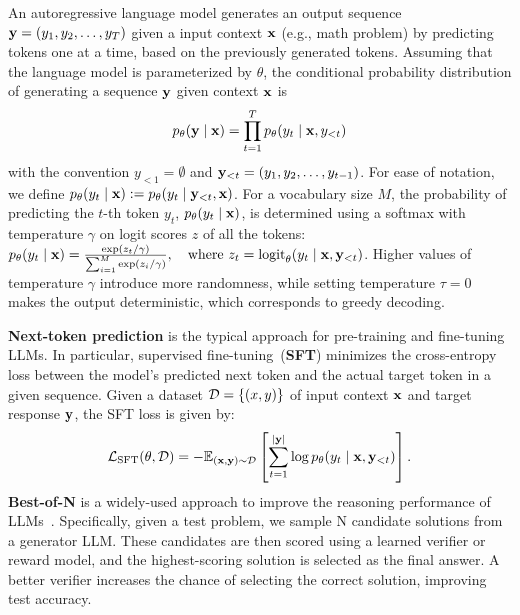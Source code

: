 
An autoregressive language model generates an output sequence ${\mathbf{y}} = (y_1, y_2, \ldots, y_T)$ given a input context ${\mathbf{x}}$ (e.g., math problem) by predicting tokens one at a time, based on the previously generated tokens. Assuming that the language model is parameterized by $\theta$, the conditional probability distribution of generating a sequence ${\mathbf{y}}$ given context ${\mathbf{x}}$ is
\begin{align}
    p_{\theta}({\mathbf{y}} \mid {\mathbf{x}}) = \prod_{t=1}^T p_{\theta}(y_t \mid {\mathbf{x}}, y_{<t})
\end{align}
with the convention $y_{<1} = \emptyset$ and ${\mathbf{y}}_{<t} = (y_1, y_2, \ldots, y_{t-1})$. For ease of notation, we define $p_\theta(y_t \mid {\mathbf{x}}) := p_\theta(y_t \mid {\mathbf{y}}_{<t}, {\mathbf{x}})$. For a vocabulary size $M$, the probability of predicting the $t$-th token $y_t$, $p_\theta(y_t \mid {\mathbf{x}})$, is determined using a softmax with temperature $\gamma$ on logit scores $z$ of all the tokens: $
p_\theta(y_t \mid {\mathbf{x}}) = \frac{\exp(z_t/\gamma)}{\sum_{i=1}^M \exp(z_i/\gamma)}, \quad \textrm{where}\ z_t = \mathrm{logit}_\theta(y_t \mid  {\mathbf{x}}, {\mathbf{y}}_{<t})$.
Higher values of temperature $\gamma$ introduce more randomness, while setting temperature $\tau=0$ makes the output deterministic, which corresponds to greedy decoding.

\textbf{Next-token prediction} is the typical approach for pre-training and fine-tuning LLMs. In particular, supervised fine-tuning~(\textbf{SFT}) minimizes the cross-entropy loss between the model's predicted next token and the actual target token in a given sequence. Given a dataset ${\mathcal{D}} = \{(x, y)\}$ of input context ${\mathbf{x}}$ and target response ${\mathbf{y}}$, the SFT loss is given by:
\begin{equation}
{\mathcal{L}}_{\text{SFT}}(\theta, {\mathcal{D}}) = -\mathbb{E}_{({\mathbf{x}}, {\mathbf{y}}) \sim {\mathcal{D}}} \left[ \sum_{t=1}^{|{\mathbf{y}}|} \log p_{\theta}(y_t \mid {\mathbf{x}}, {\mathbf{y}}_{<t}) \right].\label{eq:sft}
\end{equation}
\textbf{Best-of-N} is a widely-used approach to improve the reasoning performance of LLMs~\citep{cobbe2021training, lightman2023let}. Specifically, given a test problem, we sample N candidate solutions from a generator LLM. These candidates are then scored using a learned verifier or reward model, and the highest-scoring solution is selected as the final answer. A better verifier increases the chance of selecting the correct solution, improving test accuracy.


